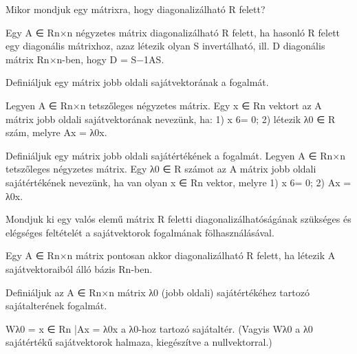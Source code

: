 \begin{frame}
  \begin{tcolorbox}[title={32}]
    Mikor mondjuk egy mátrixra, hogy diagonalizálható R felett?

  \tcblower
    Egy A ∈ Rn×n négyzetes mátrix diagonalizálható R felett, ha hasonló R felett egy diagonális mátrixhoz, azaz létezik olyan S invertálható, ill. D diagonális mátrix Rn×n-ben, hogy D = S−1AS.

  \end{tcolorbox}
\end{frame}


\begin{frame}
  \begin{tcolorbox}[title={33}]
    Deﬁniáljuk egy mátrix jobb oldali sajátvektorának a fogalmát.

  \tcblower
    Legyen A ∈ Rn×n tetszőleges négyzetes mátrix. Egy x ∈ Rn vektort az A mátrix jobb oldali sajátvektorának nevezünk, ha: 1) x 6= 0; 2) létezik λ0 ∈ R szám, melyre Ax = λ0x.

  \end{tcolorbox}
\end{frame}


\begin{frame}
  \begin{tcolorbox}[title={34}]
   Deﬁniáljuk egy mátrix jobb oldali sajátértékének a fogalmát.
  \tcblower
     Legyen A ∈ Rn×n tetszőleges négyzetes mátrix. Egy λ0 ∈ R számot az A mátrix jobb oldali sajátértékének nevezünk, ha van olyan x ∈ Rn vektor, melyre 1) x 6= 0; 2) Ax = λ0x.

  \end{tcolorbox}
\end{frame}


\begin{frame}
  \begin{tcolorbox}[title={35}]
    Mondjuk ki egy valós elemű mátrix R feletti diagonalizálhatóságának szükséges és elégséges feltételét a sajátvektorok fogalmának fölhasználásával.

  \tcblower
Egy A ∈ Rn×n mátrix pontosan akkor diagonalizálható R felett, ha létezik A sajátvektoraiból álló bázis Rn-ben. 
  \end{tcolorbox}
\end{frame}



\begin{frame}
  \begin{tcolorbox}[title={36}]
     Deﬁniáljuk az A ∈ Rn×n mátrix λ0 (jobb oldali) sajátértékéhez tartozó sajátalterének fogalmát.

  \tcblower
Wλ0 = {x ∈ Rn |Ax = λ0x} a λ0-hoz tartozó sajátaltér. (Vagyis Wλ0 a λ0 sajátértékű sajátvektorok halmaza, kiegészítve a nullvektorral.)

  \end{tcolorbox}
\end{frame}

